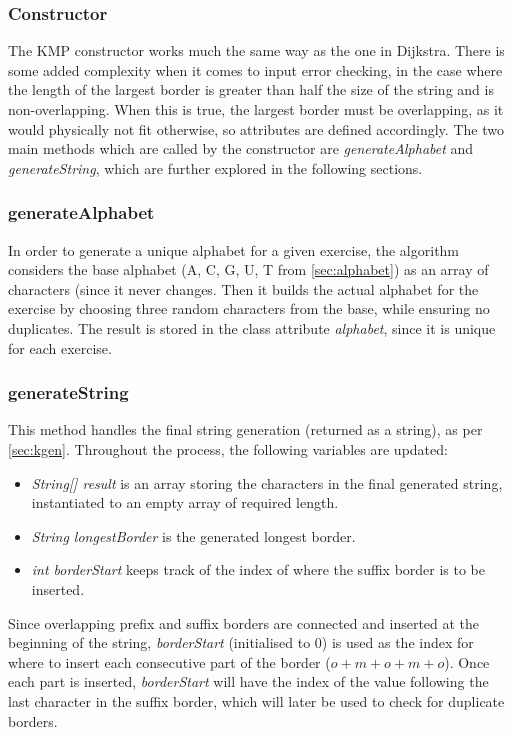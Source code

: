 \documentclass{l4proj}
\begin{document}
\subsubsection{Constructor}

The KMP constructor works much the same way as the one in Dijkstra. There is some added complexity when it comes to input error checking, in the case where the length of the largest border is greater than half the size of the string and is non-overlapping. When this is true, the largest border must be overlapping, as it would physically not fit otherwise, so attributes are defined accordingly. The two main methods which are called by the constructor are \emph{generateAlphabet} and \emph{generateString}, which are further explored in the following sections.

\subsubsection{generateAlphabet}

In order to generate a unique alphabet for a given exercise, the algorithm considers the base alphabet (A, C, G, U, T from \autoref{sec:alphabet}) as an array of characters (since it never changes. Then it builds the actual alphabet for the exercise by choosing three random characters from the base, while ensuring no duplicates. The result is stored in the class attribute \emph{alphabet}, since it is unique for each exercise.

\subsubsection{generateString}

This method handles the final string generation (returned as a string), as per \autoref{sec:kgen}. Throughout the process, the following variables are updated:

\begin{itemize}
	\item
	\emph{String[] result} is an array storing the characters in the final generated string, instantiated to an empty array of required length.
	\item
	\emph{String longestBorder} is the generated longest border.
	\item
	\emph{int borderStart} keeps track of the index of where the suffix border is to be inserted.
\end{itemize}

Since overlapping prefix and suffix borders are connected and inserted at the beginning of the string, \emph{borderStart} (initialised to $0$) is used as the index for where to insert each consecutive part of the border ($o+m+o+m+o$). Once each part is inserted, \emph{borderStart} will have the index of the value following the last character in the suffix border, which will later be used to check for duplicate borders.
\end{document}

